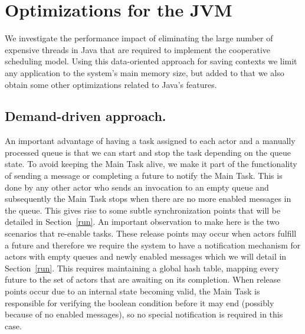 \section{Optimizations for the JVM}
\label{optimizations}
We investigate the performance impact of eliminating the large number of expensive threads in Java that are required to implement the cooperative scheduling model. Using this data-oriented approach for saving contexts we limit any application to the system's main memory size, but added to that we also obtain some other optimizations related to Java's features.

\subsection{Demand-driven approach.}
An important advantage of having a task assigned to each actor and a manually processed queue is that we can start and stop the task depending on the queue state. To avoid keeping the Main Task alive, we make it part of the functionality of sending a message or completing a future to notify the Main Task. This is done by any other actor who sends an invocation to an empty queue and subsequently the Main Task stops when there are no more enabled messages in the queue. This gives rise to some subtle synchronization points that will be detailed in Section~\ref{run}. An important observation to make here is the two scenarios that re-enable tasks. These release points may occur when actors fulfill a future and therefore we require the system to have a notification mechanism for actors with empty queues and newly enabled messages which we will detail in Section~\ref{run}. This requires maintaining a global hash table, mapping every future to the set of actors that are awaiting on its completion. When release points occur due to an internal state becoming valid, the Main Task is responsible for verifying the boolean condition before it may end (possibly because of no enabled messages), so no special notification is required in this case.



